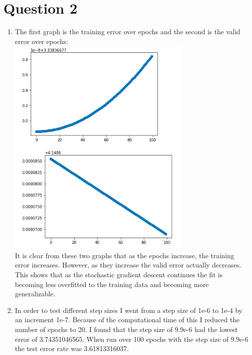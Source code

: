 \documentclass{article}
\begin{document}
\section*{Question 2}
\begin{enumerate}
\item  The first graph is the training error over epochs and the second is the valid error over epochs:\\
\includegraphics[width=9cm]{train_valid2a}\\

It is clear from these two graphs that as the epochs increase, the training error increases.  However, as they increase the valid error actually decreases.  This shows that as the stochastic gradient descent continues the fit is becoming less overfitted to the training data and becoming more generalizable.
\item In order to test different step sizes I went from a step size of 1e-6 to 1e-4 by an increment 1e-7.  Because of the computational time of this I reduced the number of epochs to 20.  I found that the step size of 9.9e-6  had the lowest error of 3.74351046565.  When run over 100 epochs with the step size of 9.9e-6 the test error rate was 3.61813316037. 


\end{enumerate}
\end{document}
